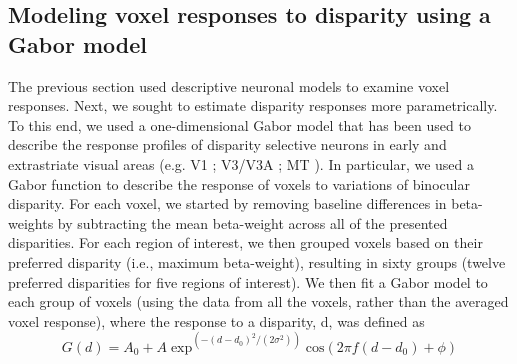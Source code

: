 \subsection{Modeling voxel responses to disparity using a Gabor model}
The previous section used descriptive neuronal models to examine voxel responses. Next, we sought to estimate disparity responses more parametrically. To this end, we used a one-dimensional Gabor model that has been used to describe the response profiles of disparity selective neurons in early and extrastriate visual areas (e.g. V1 \cite{Prince:2002uq}; V3/V3A \cite{Anzai:2011gb}; MT \cite{DeAngelis:2003nh}). In particular, we used a Gabor function to describe the response of voxels to variations of binocular disparity. For each voxel, we started by removing baseline differences in beta-weights by subtracting the mean beta-weight across all of the presented disparities. For each region of interest, we then grouped voxels based on their preferred disparity (i.e., maximum beta-weight), resulting in sixty groups (twelve preferred disparities for five regions of interest). We then fit a Gabor model to each group of voxels (using the data from all the voxels, rather than the averaged voxel response), where the response to a disparity, d, was defined as
\begin{equation}
G(d)= A_0  + A\exp^{(-(d-d_{0})^2/(2 \sigma ^2 ))}\mathrm{cos}(2 \pi f(d-d_0)+ \phi )
\end{equation}
